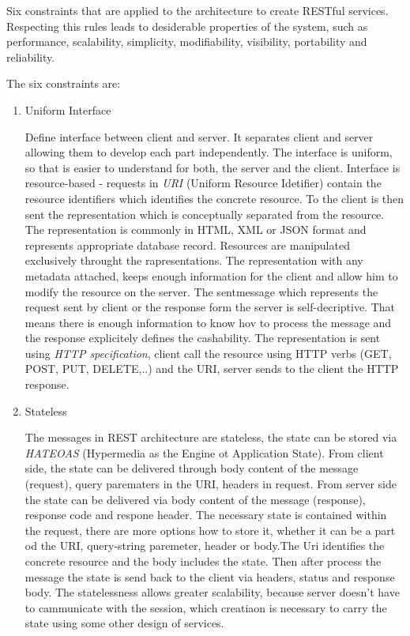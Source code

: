 Six constraints that are applied to the architecture to create RESTful services. Respecting this rules leads to desiderable properties of the system, such as performance, scalability, simplicity, modifiability, visibility, portability and reliability. 
\begin{description}
  \item The six constraints are:

\begin{enumerate}
  \item Uniform Interface
  
Define interface between client and server. It separates client and server allowing them to develop each part independently. The interface is uniform, so that is
easier to understand for both, the server and the client.
Interface is resource-based - requests in \emph {URI} (Uniform Resource Idetifier) contain the resource identifiers which identifies the concrete resource. To the client is then sent the representation which is conceptually separated from the resource. The representation is commonly in HTML, XML or JSON format and represents appropriate database record.
Resources are manipulated exclusively throught the rapresentations. The representation with any metadata attached, keeps enough information for the client and allow him to modify the resource on the server.
The sentmessage which represents the request sent by client or the response form the server is self-decriptive. That means there is enough information to know hov to process the message and the response explicitely defines the cashability.
The representation is sent using \emph {HTTP specification}, client call the resource using HTTP verbs (GET, POST, PUT, DELETE,..) and the URI, server sends to the client the HTTP response.


  \item Stateless

The messages in REST architecture are stateless, the state can be stored via \emph {HATEOAS} (Hypermedia as the Engine ot Application State). From client side, the state can be delivered through body content of the message (request), query parematers in the URI, headers in request. From server side the state can be delivered via body content of the message (response), response code and respone header. 
The necessary state is contained within the request, there are more options how to store it, whether it can be a part od the URI, query-string paremeter, header or body.The Uri identifies the concrete resource and the body includes the state. Then after process the message the state is send back to the client via headers, status and response body.
The statelessness allows greater scalability, because server doesn't have to cammunicate with the session, which creatiaon is necessary to carry the state using some other design of services.



\end{enumerate}
\end{description}

